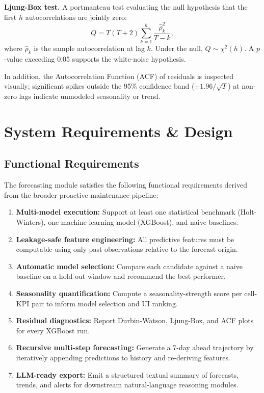 \textbf{Ljung-Box test.} A portmanteau test evaluating the null hypothesis that the first $h$ autocorrelations are jointly zero:
\begin{equation}
Q = T(T+2)\sum_{k=1}^{h}\frac{\hat{\rho}_k^2}{T-k},
\end{equation}
where $\hat{\rho}_k$ is the sample autocorrelation at lag $k$. Under the null, $Q \sim \chi^2(h)$. A $p$-value exceeding 0.05 supports the white-noise hypothesis.

In addition, the Autocorrelation Function (ACF) of residuals is inspected visually; significant spikes outside the 95\% confidence band ($\pm 1.96/\sqrt{T}$) at non-zero lags indicate unmodeled seasonality or trend.


\section{System Requirements \& Design}
\label{sec:forecasting_design}

\subsection{Functional Requirements}

The forecasting module satisfies the following functional requirements derived from the broader proactive maintenance pipeline:

\begin{enumerate}[label=FR-\arabic*.]
    \item \textbf{Multi-model execution:} Support at least one statistical benchmark (Holt-Winters), one machine-learning model (XGBoost), and naive baselines.
    \item \textbf{Leakage-safe feature engineering:} All predictive features must be computable using only past observations relative to the forecast origin.
    \item \textbf{Automatic model selection:} Compare each candidate against a naive baseline on a hold-out window and recommend the best performer.
    \item \textbf{Seasonality quantification:} Compute a seasonality-strength score per cell-KPI pair to inform model selection and UI ranking.
    \item \textbf{Residual diagnostics:} Report Durbin-Watson, Ljung-Box, and ACF plots for every XGBoost run.
    \item \textbf{Recursive multi-step forecasting:} Generate a 7-day ahead trajectory by iteratively appending predictions to history and re-deriving features.
    \item \textbf{LLM-ready export:} Emit a structured textual summary of forecasts, trends, and alerts for downstream natural-language reasoning modules.
\end{enumerate}

